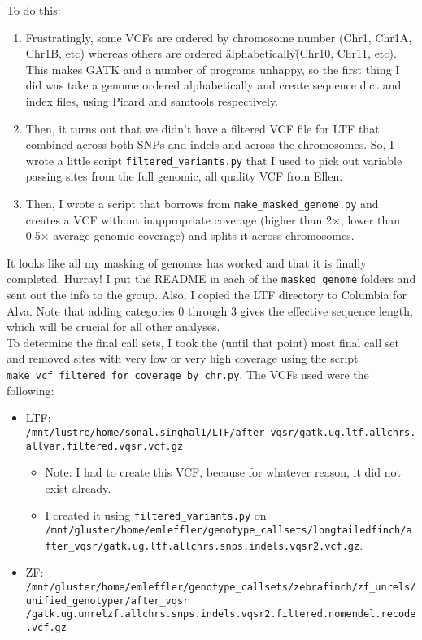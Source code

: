\documentclass[idxtotoc,hyperref,openany,oneside]{labbook} %
\begin{document}
To do this:
\begin{enumerate}
\item Frustratingly, some VCFs are ordered by chromosome number (Chr1, Chr1A, Chr1B, etc) whereas others are ordered \"alphabetically\" (Chr10, Chr11, etc). This makes GATK and a number of programs unhappy, so the first thing I did was take a genome ordered alphabetically and create sequence dict and index files, using Picard and samtools respectively.
\item Then, it turns out that we didn't have a filtered VCF file for LTF that combined across both SNPs and indels and across the chromosomes. So, I wrote a little script \texttt{filtered\_variants.py} that I used to pick out variable passing sites from the full genomic, all quality VCF from Ellen.
\item Then, I wrote a script that borrows from \texttt{make\_masked\_genome.py} and creates a VCF without inappropriate coverage (higher than 2$\times$, lower than 0.5$\times$ average genomic coverage) and splits it across chromosomes.
\end{enumerate}



It looks like all my masking of genomes has worked and that it is finally completed. Hurray! I put the README in each of the \texttt{masked\_genome} folders and sent out the info to the group. Also, I copied the LTF directory to Columbia for Alva. Note that adding categories 0 through 3 gives the effective sequence length, which will be crucial for all other analyses. \\

To determine the final call sets, I took the (until that point) most final call set and removed sites with very low or very high coverage using the script \texttt{make\_vcf\_filtered\_for\_coverage\_by\_chr.py}. The VCFs used were the following:
\begin{itemize}
\item LTF: \texttt{/mnt/lustre/home/sonal.singhal1/LTF/after\_vqsr/gatk.ug.ltf.allchrs.allvar.filtered.vqsr.vcf.gz}
\begin{itemize}
\item Note: I had to create this VCF, because for whatever reason, it did not exist already.
\item I created it using \texttt{filtered\_variants.py} on \texttt{/mnt/gluster/home/emleffler/genotype\_callsets/longtailedfinch/after\_vqsr/gatk.ug.ltf.allchrs.snps.indels.vqsr2.vcf.gz}.
\end{itemize}
\item  ZF: \texttt{/mnt/gluster/home/emleffler/genotype\_callsets/zebrafinch/zf\_unrels/unified\_genotyper/after\_vqsr
/gatk.ug.unrelzf.allchrs.snps.indels.vqsr2.filtered.nomendel.recode.vcf.gz
}
\end{itemize}
\end{document}
